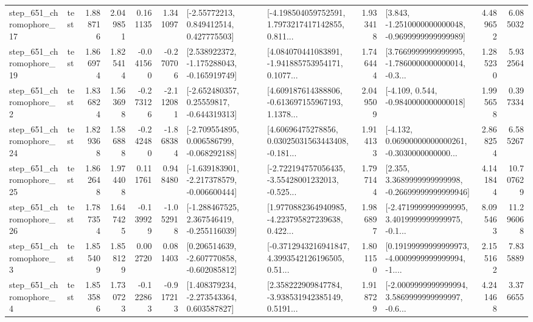 \begin{tabular}{llrrrrllrlrr}
  step\_651\_chromophore\_17 &      test &      1.888716 &    2.049851 &      0.161135 &  1.341097 &     [-2.55772213, 0.849412514, 0.427775503] &  [-4.198504059752591, 1.7973217417142855, 0.811... &       1.933418 &  [3.843, -1.2510000000000048, -0.9699999999999989] &            4.489652 &          6.085032 \\
  step\_651\_chromophore\_19 &      test &      1.866974 &    1.825414 &     -0.041560 & -0.270706 &   [2.538922372, -1.175288043, -0.165919749] &  [4.084070441083891, -1.941885753954171, 0.1077... &       1.746444 &  [3.7669999999999995, -1.7860000000000014, -0.3... &            1.285230 &          5.932564 \\
   step\_651\_chromophore\_2 &      test &      1.836824 &    1.563698 &     -0.273126 & -2.112081 &    [-2.652480357, 0.25559817, -0.644319313] &  [4.609187614388806, -0.613697155967193, 1.1378... &       2.049509 &               [-4.109, 0.544, -0.9840000000000018] &            1.995658 &          0.397334 \\
  step\_651\_chromophore\_24 &      test &      1.829368 &    1.586888 &     -0.242480 & -1.868384 &   [-2.709554895, 0.006586799, -0.068292188] &  [4.60696475278856, 0.03025031563443408, -0.181... &       1.914133 &  [-4.132, 0.06900000000000261, -0.3030000000000... &            2.868254 &          6.585267 \\
  step\_651\_chromophore\_25 &      test &      1.862648 &    1.974408 &      0.111761 &  0.948480 &  [-1.639183901, -2.217378579, -0.006600444] &  [-2.722194757056435, -3.55428001232013, -0.525... &       1.797144 &  [2.355, 3.3689999999999998, -0.26699999999999946] &            4.141844 &         10.707629 \\
  step\_651\_chromophore\_26 &      test &      1.787354 &    1.647425 &     -0.139929 & -1.052918 &   [-1.288467525, 2.367546419, -0.255116039] &  [1.9770882364940985, -4.223795827239638, 0.422... &       1.986897 &  [-2.4719999999999995, 3.4019999999999975, -0.1... &            8.095463 &         11.296068 \\
   step\_651\_chromophore\_3 &      test &      1.855409 &    1.858129 &      0.002720 &  0.081403 &   [0.206514639, -2.607770858, -0.602085812] &  [-0.3712943216941847, 4.3993542126196505, 0.51... &       1.801150 &  [0.19199999999999973, -4.0009999999999994, -1.... &            2.155162 &          7.835889 \\
   step\_651\_chromophore\_4 &      test &      1.853586 &    1.730723 &     -0.122863 & -0.917213 &    [1.408379234, -2.273543364, 0.603587827] &  [2.358222909847784, -3.938531942385149, 0.5191... &       1.918729 &  [-2.0009999999999994, 3.5869999999999997, -0.6... &            4.241468 &          3.376655 \\

\end{tabular}
